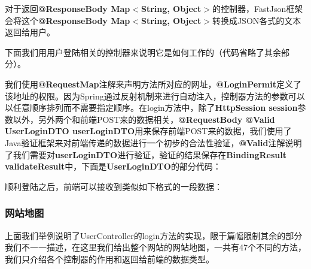对于返回\textbf{@ResponseBody Map$<$String, Object$>$}的控制器，FastJson框架会将这个\textbf{@ResponseBody Map$<$String, Object$>$}转换成JSON各式的文本返回给用户。

下面我们用用户登陆相关的控制器来说明它是如何工作的（代码省略了其余部分）。



我们使用\textbf{@RequestMap}注解来声明方法所对应的网址，\textbf{@LoginPermit}定义了该地址的权限。因为Spring通过反射机制来进行自动注入，控制器方法的参数可以以任意顺序排列而不需要指定顺序。在login方法中，除了\textbf{HttpSession session}参数以外，另外两个和前端POST来的数据相关，\textbf{@RequestBody @Valid UserLoginDTO userLoginDTO}用来保存前端POST来的数据，我们使用了Java验证框架来对前端传递的数据进行一个初步的合法性验证，\textbf{@Valid}注解说明了我们需要对\textbf{userLoginDTO}进行验证，验证的结果保存在\textbf{BindingResult validateResult}中，下面是\textbf{UserLoginDTO}的部分代码：



顺利登陆之后，前端可以接收到类似如下格式的一段数据：



\subsubsection{网站地图}
上面我们举例说明了UserController的login方法的实现，限于篇幅限制其余的部分我们不一一描述，在这里我们给出整个网站的网站地图，一共有47个不同的方法，我们只介绍各个控制器的作用和返回给前端的数据类型。

